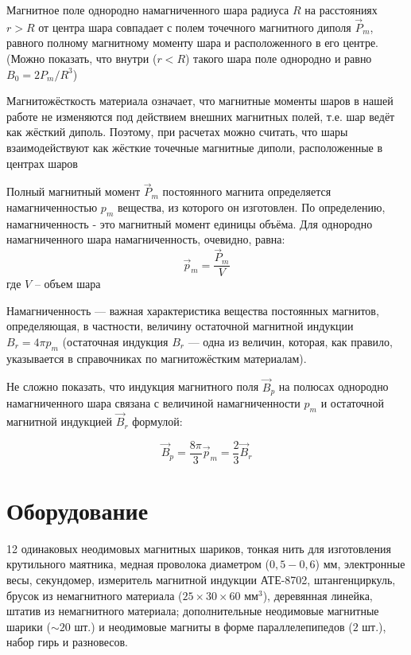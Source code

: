 Магнитное поле однородно намагниченного шара радиуса $R$ на расстояниях $r > R$ от центра
шара совпадает с полем точечного магнитного диполя $\vec P_m$, равного полному магнитному моменту
шара и расположенного в его центре. (Можно показать, что внутри ($r < R$) такого шара поле однородно
и равно $B_0 = 2P_m/R^3$)

Магнитожёсткость материала означает, что магнитные моменты шаров в нашей работе не изменяются под действием внешних магнитных полей, т.е. шар ведёт как жёсткий диполь. Поэтому, при расчетах можно считать, что шары взаимодействуют как жёсткие точечные магнитные диполи, расположенные в центрах шаров

Полный магнитный момент $\vec P_m$ постоянного магнита определяется намагниченностью $p_m$ вещества, из которого он изготовлен. По определению, намагниченность - это магнитный момент единицы объёма. Для однородно намагниченного шара намагниченность, очевидно, равна:
\begin{equation}
    \vec p_m = \frac{\vec P_m}{V}
\end{equation}
где $V$ -- объем шара

Намагниченность — важная характеристика вещества постоянных магнитов, определяющая, в частности,
величину остаточной магнитной индукции $B_r = 4\pi p_m$ (остаточная индукция $B_r$ — одна из величин, которая, как правило, указывается в справочниках по магнитожёстким материалам).

Не сложно показать, что индукция магнитного поля $\vec B_p$ на полюсах
однородно намагниченного шара связана с величиной намагниченности $p_m$ и остаточной магнитной
индукцией $\vec B_r$ формулой:

\begin{equation}
    \vec B_p = \frac{8\pi}{3}\vec p_m = \frac{2}{3} \vec B_r
\end{equation}

\section{Оборудование}
12 одинаковых неодимовых магнитных шариков, тонкая нить для изготовления крутильного маятника,
медная проволока диаметром ($0,5 - 0,6$) мм, электронные весы, секундомер, измеритель магнитной
индукции АТЕ-8702, штангенциркуль, брусок из немагнитного материала ($25\times 30\times60$ мм$^3$), деревянная
линейка, штатив из немагнитного материала; дополнительные неодимовые магнитные шарики ($\sim 20$ шт.) и
неодимовые магниты в форме параллелепипедов ($2$ шт.), набор гирь и разновесов.

